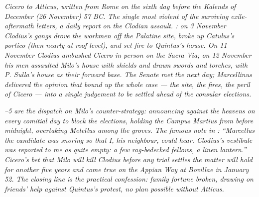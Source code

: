 
\textit{Cicero to Atticus, written from Rome on the sixth day
before the Kalends of December (26 November) 57 BC. The
single most violent of the surviving exile-aftermath letters,
a daily report on the Clodian assault. : on
3 November Clodius's gangs drove the workmen off the Palatine
site, broke up Catulus's portico (then nearly at roof level),
and set fire to Quintus's house. On 11 November Clodius
ambushed Cicero in person on the Sacra Via; on 12 November
his men assaulted Milo's house with shields and drawn swords
and torches, with P. Sulla's house as their forward base. The
Senate met the next day; Marcellinus delivered the opinion
that bound up the whole case --- the site, the fires, the
peril of Cicero --- into a single judgement to be settled
ahead of the consular elections.}

\textit{--5 are the dispatch on Milo's
counter-strategy: announcing against the heavens on every
comitial day to block the elections, holding the Campus
Martius from before midnight, overtaking Metellus among the
groves. The famous note in : ``Marcellus the
candidate was snoring so that I, his neighbour, could hear.
Clodius's vestibule was reported to me as quite empty: a few
rag-bedecked fellows, a linen lantern.'' Cicero's bet that
Milo will kill Clodius before any trial settles the matter
will hold for another five years and come true on the Appian
Way at Bovillae in January 52. The closing line is the
practical confession: family fortune broken, drawing on
friends' help against Quintus's protest, no plan possible
without Atticus.}
